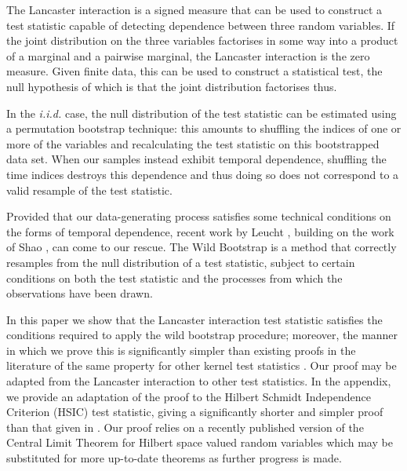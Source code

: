 \documentclass[]{article}
\begin{document}
The Lancaster interaction \cite{lancaster1969chi}\cite{sejdinovic2013kernel} is a signed measure that can be used to construct a test statistic capable of detecting dependence between three random variables. If the joint distribution on the three variables factorises in some way into a product of a marginal and a pairwise marginal, the Lancaster interaction is the zero measure. Given finite data, this can be used to construct a statistical test, the null hypothesis of which is that the joint distribution factorises thus. 	

In the \emph{i.i.d.} case, the null distribution of the test statistic can be estimated using a permutation bootstrap technique: this amounts to shuffling the indices of one or more of the variables and recalculating the test statistic on this bootstrapped data set. When our samples instead exhibit temporal dependence, shuffling the time indices destroys this dependence and thus doing so does not correspond to a valid resample of the test statistic. 

Provided that our data-generating process satisfies some technical conditions on the forms of temporal dependence, recent work by Leucht \cite{leucht2013dependent}, building on the work of Shao \cite{shao2010dependent}, can come to our rescue. The Wild Bootstrap is a method that correctly resamples from the null distribution of a test statistic, subject to certain conditions on both the test statistic and the processes from which the observations have been drawn.

In this paper we show that the Lancaster interaction test statistic satisfies the conditions required to apply the wild bootstrap procedure; moreover, the manner in which we prove this is significantly simpler than existing proofs in the literature of the same property for other kernel test statistics \cite{chwialkowski2014wild}\cite{chwialkowski2014kernel}. Our proof may be adapted from the Lancaster interaction to other test statistics. In the appendix, we provide an adaptation of the proof to the Hilbert Schmidt Independence Criterion (HSIC) test statistic, giving a significantly shorter and simpler proof than that given in \cite{chwialkowski2014kernel}. Our proof relies on a recently published version of the Central Limit Theorem for Hilbert space valued random variables \cite{dehling2015bootstrap} which may be substituted for more up-to-date theorems as further progress is made.
\end{document}
